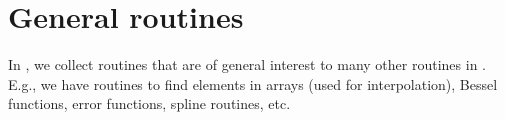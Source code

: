 \section{General routines}

In , we collect routines that are of general interest to
many other routines in \ds. E.g., we have routines to find elements in
arrays (used for interpolation), Bessel functions, error functions,
spline routines, etc.

